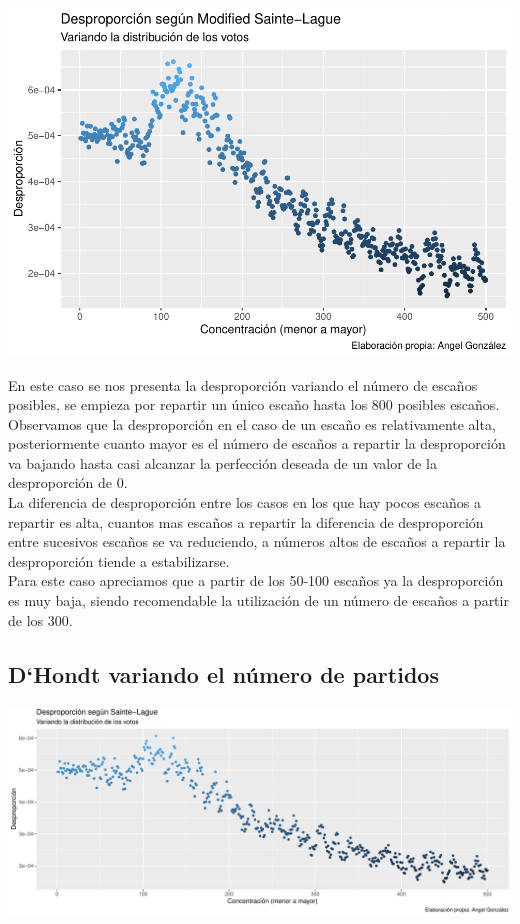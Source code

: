 \documentclass[12pt,a4paper,]{book}
\numberwithin{dummy}{section}
\theoremstyle{ocrenumbox}
\theoremstyle{blacknumex}
\theoremstyle{blacknumbox}
\theoremstyle{ocrenum}
\theoremstyle{ocrenum}
\begin{document}
\begin{center}\includegraphics[width=0.95\linewidth]{figurasR/unnamed-chunk-18-1} \end{center}

En este caso se nos presenta la desproporción variando el número de
escaños posibles, se empieza por repartir un único escaño hasta los 800
posibles escaños. Observamos que la desproporción en el caso de un
escaño es relativamente alta, posteriormente cuanto mayor es el número
de escaños a repartir la desproporción va bajando hasta casi alcanzar la
perfección deseada de un valor de la desproporción de 0.\\
La diferencia de desproporción entre los casos en los que hay pocos
escaños a repartir es alta, cuantos mas escaños a repartir la diferencia
de desproporción entre sucesivos escaños se va reduciendo, a números
altos de escaños a repartir la desproporción tiende a estabilizarse.\\
Para este caso apreciamos que a partir de los 50-100 escaños ya la
desproporción es muy baja, siendo recomendable la utilización de un
número de escaños a partir de los 300.

\hypertarget{dhondt-variando-el-nuxfamero-de-partidos}{%
\subsection{D`Hondt variando el número de
partidos}\label{dhondt-variando-el-nuxfamero-de-partidos}}

\begin{center}\includegraphics[width=0.95\linewidth]{figurasR/unnamed-chunk-19-1} \end{center}
\end{document}
